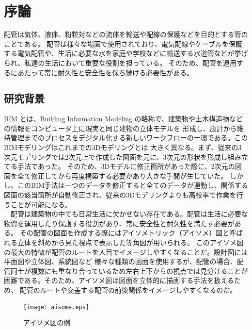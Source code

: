 \chapter{%
序論}

配管は気体、液体、粉粒対などの流体を輸送や配線の保護などを目的とする管のことである。
配管は様々な場面で使用されており、電気配線やケーブルを保護する電気配管や、生活に必要な水を家庭や学校などに輸送する水道管などが挙げられ、私達の生活において重要な役割を担っている。
そのため、配管を運用するにあたって常に耐久性と安全性を保ち続ける必要性がある。 \\

\section{研究背景}
BIM とは、Building Information Modeling の略称で、建築物や土木構造物などの情報をコンピュータ上に現実と同じ建物の立体モデルを
形成し、設計から維持管理までのプロセスをデジタル化する新しいワークフローの一環である。このBIMモデリングはこれまでの3Dモデリングとは
大きく異なる。まず、従来の3次元モデリングでは2次元上で作成した図面を元に、3次元の形状を形成し組み立てる手法であった。
そのため、3Dモデルに修正箇所があった際に、2次元の図面を全て修正してから再度構築する必要があり大きな手間が生じていた。
しかし、このBIM手法は一つのデータを修正すると全てのデータが連動し、関係する図面の該当箇所が自動修正され、従来の3Dモデリングよりも高校率で作業を行うことが可能になる。\\
　配管は建築物の中でも日常生活に欠かせない存在である。配管は生活に必要な物資を運用したり保護する役割があり、常に安全性と耐久性を満たす必要がある。
その配管の図面を作成する際にはアイソメトリック（アイソメ）図と呼ばれる立体を斜めから見た視点で表示した等角図が用いられる。
このアイソメ図の最大の特徴が配管のルートを人目でイメージしやすくなることだ。設計図には平面図や立体図、系統図など
様々な種類の図面を使用するが、配管の場合、配管同士が複数にも重なり合っているため左右上下からの視点では見分けることが困難である。そのため、アイソメ図は図面を立体的に描画する手法を扱えるため、
配管のルートや交差する配管の前後関係をイメージしやすくなるのだ。\\
\begin{figure}[htbt]
	\centering
	 \texttt{[image: aisome.eps]}
	 \caption{アイソメ図の例}
	 \label{fig:f1}
\end{figure}

